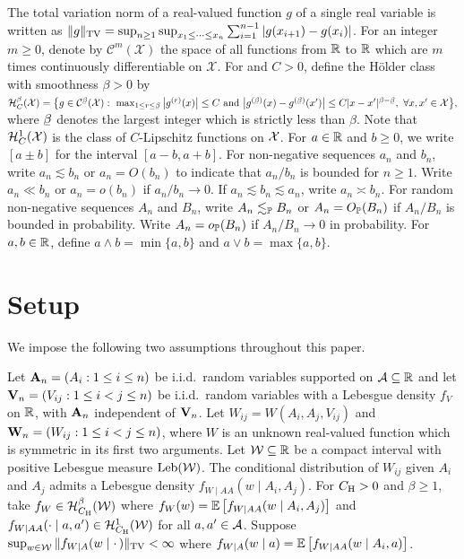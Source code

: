 The total variation norm of a
real-valued function $g$ of a single real variable is
written as
$\|g\|_\TV = \sup_{n \geq 1} \sup_{x_1 \leq \cdots \leq x_n}
\sum_{i=1}^{n-1} |g(x_{i+1}) - g(x_i)|$.
For an integer $m\geq 0$,
denote by $\mathcal{C}^m(\mathcal{X})$
the space of all functions from $\R$ to $\R$
which are $m$ times continuously differentiable on $\mathcal{X}$.
For and $C>0$, define the H\"{o}lder class
with smoothness $\beta > 0$ by
$\cH^\beta_C(\cX) =
\big\{
  g \in \cC^{\flbeta}(\cX): \
  \max_{1 \leq r \leq \flbeta}
  \big| g^{(r)}(x) \big| \leq C
  \text{ and }
  \big| g^{(\flbeta)}(x) - g^{(\flbeta)}(x') \big|
  \leq C |x-x'|^{\beta - \flbeta}, \
  \forall x, x' \in \cX
\big\},
$
where $\flbeta$ denotes the largest integer
which is strictly less than $\beta$.
Note that $\cH^1_C(\cX)$
is the class of $C$-Lipschitz functions on $\cX$.
For $a \in \R$ and $b \geq 0$,
we write $[a \pm b]$ for the interval $[a-b, a+b]$.
For non-negative sequences
$a_n$ and $b_n$, write
$a_n \lesssim b_n$ or $a_n = O(b_n)$
to indicate that
$a_n / b_n$ is bounded for $n\geq 1$.
Write $a_n \ll b_n$ or $a_n = o(b_n)$ if $a_n / b_n \to 0$.
If $a_n \lesssim b_n \lesssim a_n$,
write $a_n \asymp b_n$.
For random non-negative sequences
$A_n$ and $B_n$, write
$A_n \lesssim_\P B_n$ or $A_n = O_\P(B_n)$ if
$A_n / B_n$ is bounded in probability.
Write $A_n = o_\P(B_n)$ if $A_n / B_n \to 0$ in probability.
For $a,b \in \R$, define $a\wedge b=\min\{a,b\}$ and
$a \vee b = \max\{a,b\}$.

\section{Setup}\label{sec:kernel_setup}

We impose the following two assumptions throughout this paper.
%
\begin{assumption}[Data generation]\label{ass:kernel_data}\onehalfspacing
  Let $\bA_n = (A_i: 1 \leq i \leq n)$ be i.i.d.\
  random variables supported on $\cA \subseteq \R$
  and let $\bV_n = (V_{i j}: 1 \leq i < j \leq n)$
  be i.i.d.\ random variables with a Lebesgue density $f_V$ on $\R$,
  with $\bA_n$ independent of $\bV_n$.
  Let $W_{i j} = W(A_i, A_j, V_{i j})$
  and $\bW_n = (W_{i j}: 1 \leq i < j \leq n)$,
  where $W$ is an unknown real-valued function
  which is symmetric in its first two arguments.
  Let $\cW \subseteq \R$ be a compact interval
  with positive Lebesgue measure $\Leb(\cW)$.
  The conditional distribution
  of $W_{i j}$ given $A_i$ and $A_j$
  admits a Lebesgue density $f_{W \mid AA}(w \mid A_i, A_j)$.
  For $C_\rH > 0$ and $\beta \geq 1$,
  take $f_W \in \cH^\beta_{C_\rH}(\cW)$ where
  $f_{W}(w) = \E\left[f_{W \mid AA}(w \mid A_i,A_j)\right]$
  and
  $f_{W \mid AA}(\cdot \mid a, a') \in \cH^1_{C_\rH}(\cW)$
  for all $a,a' \in \cA$.
  Suppose
  $\sup_{w \in \cW} \|f_{W \mid A}(w \mid \cdot\,)\|_\TV <\infty$ where
  $f_{W \mid A}(w \mid a) = \E\left[f_{W \mid AA}(w \mid A_i,a)\right]$.
\end{assumption}

